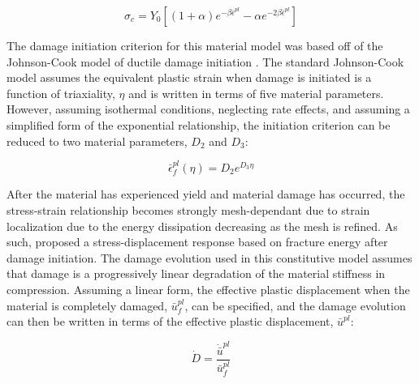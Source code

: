 \begin{equation}
\sigma_c=Y_0\left [ \left ( 1+\alpha \right ) e^{-\beta\bar{\epsilon}^{pl}}-\alpha e^{-2\beta\bar{\epsilon}^{pl}}  \right ]
\label{eqn:param2-1}
\end{equation}

The damage initiation criterion for this material model was based off of the Johnson-Cook model of ductile damage initiation \cite{Johnson_1985}. The standard Johnson-Cook model assumes the equivalent plastic strain when damage is initiated is a function of triaxiality, $\eta$ and is written in terms of five material parameters. However, assuming isothermal conditions, neglecting rate effects, and assuming a simplified form of the exponential relationship, the initiation criterion can be reduced to two material parameters, $D_2$ and $D_3$:

\begin{equation}
\bar{\epsilon}_{f}^{pl}\left(\eta\right)=D_{2}e^{D_{3}\eta}\label{eqn:druc8}
\end{equation}

After the material has experienced yield and material damage has occurred, the stress-strain relationship becomes strongly mesh-dependant due to strain localization due to the energy dissipation decreasing as the mesh is refined. As such, \citet{Hillerborg_1976} proposed a stress-displacement response based on fracture energy after damage initiation. The damage evolution used in this constitutive model assumes that damage is a progressively linear degradation of the material stiffness in compression. Assuming a linear form, the effective plastic displacement when the material is completely damaged, $\bar{u}^{pl}_f$, can be specified, and the damage evolution can then be written in terms of the effective plastic displacement, $\bar{u}^{pl}$:

\begin{equation}
\dot{D}=\frac{\dot{\bar{u}}^{pl}}{\bar{u}_{f}^{pl}}\label{eqn:druc9-1}
\end{equation}

